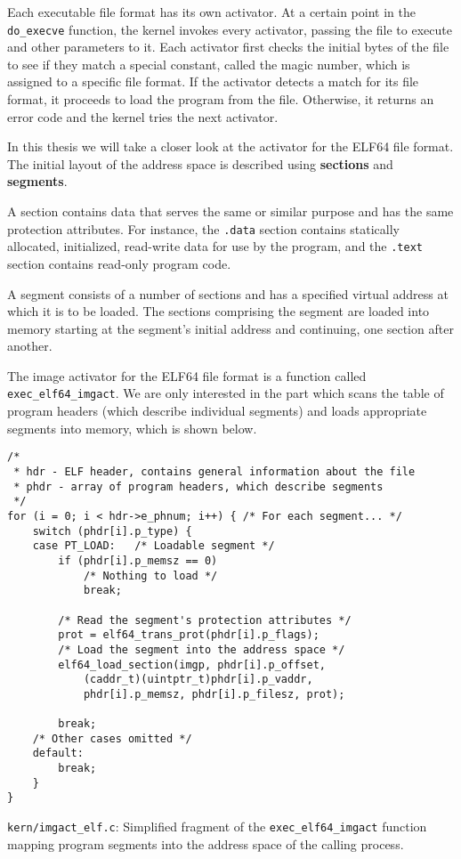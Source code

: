 \documentclass[shortabstract, english]{iithesis}
\begin{document}
Each executable file format has its own activator. At a certain point in the
\texttt{do_execve} function, the kernel invokes every activator, passing
the file to execute and other parameters to it. Each activator first checks the
initial bytes of the file to see if they match a special constant, called the
magic number, which is assigned to a specific file format. If the activator
detects a match for its file format, it proceeds to load the program from the
file. Otherwise, it returns an error code and the kernel tries the next
activator.

In this thesis we will take a closer look at the activator for the ELF64 file
format. The initial layout of the address space is described using
\textbf{sections} and \textbf{segments}.

A section contains data that serves the same or similar purpose and has the same
protection attributes. For instance, the \texttt{.data} section contains
statically allocated, initialized, read-write data for use by the program, and
the \texttt{.text} section contains read-only program code.

A segment consists of a number of sections and has a specified virtual address
at which it is to be loaded. The sections comprising the segment are loaded into
memory starting at the segment's initial address and continuing, one section
after another.

The image activator for the ELF64 file format is a function called
\texttt{exec_elf64_imgact}. We are only interested in the part which
scans the table of program headers (which describe individual segments) and
loads appropriate segments into memory, which is shown below.

\begin{listing}[H]
\begin{verbatim}
/*
 * hdr - ELF header, contains general information about the file
 * phdr - array of program headers, which describe segments
 */
for (i = 0; i < hdr->e_phnum; i++) { /* For each segment... */
    switch (phdr[i].p_type) {
    case PT_LOAD:   /* Loadable segment */
        if (phdr[i].p_memsz == 0)
            /* Nothing to load */
            break;

        /* Read the segment's protection attributes */
        prot = elf64_trans_prot(phdr[i].p_flags);
        /* Load the segment into the address space */
        elf64_load_section(imgp, phdr[i].p_offset,
            (caddr_t)(uintptr_t)phdr[i].p_vaddr,
            phdr[i].p_memsz, phdr[i].p_filesz, prot);

        break;
    /* Other cases omitted */
    default:
        break;
    }
}
\end{verbatim}
  \caption{\texttt{kern/imgact\_elf.c}: Simplified fragment of the
    \texttt{exec_elf64_imgact} function mapping program segments into the
    address space of the calling process.}
\end{listing}
\end{document}
